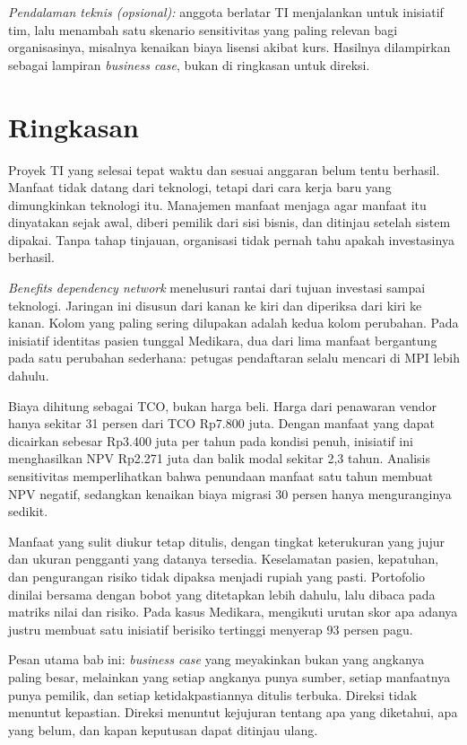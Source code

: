 \textit{Pendalaman teknis (opsional):} anggota berlatar TI menjalankan
 untuk inisiatif tim,
lalu menambah satu skenario sensitivitas yang paling relevan bagi
organisasinya, misalnya kenaikan biaya lisensi akibat kurs. Hasilnya
dilampirkan sebagai lampiran \textit{business case}, bukan di ringkasan untuk
direksi.

\section{Ringkasan}

Proyek TI yang selesai tepat waktu dan sesuai anggaran belum tentu berhasil.
Manfaat tidak datang dari teknologi, tetapi dari cara kerja baru yang
dimungkinkan teknologi itu. Manajemen manfaat menjaga agar manfaat itu
dinyatakan sejak awal, diberi pemilik dari sisi bisnis, dan ditinjau setelah
sistem dipakai. Tanpa tahap tinjauan, organisasi tidak pernah tahu apakah
investasinya berhasil.

\textit{Benefits dependency network} menelusuri rantai dari tujuan investasi
sampai teknologi. Jaringan ini disusun dari kanan ke kiri dan diperiksa dari
kiri ke kanan. Kolom yang paling sering dilupakan adalah kedua kolom
perubahan. Pada inisiatif identitas pasien tunggal Medikara, dua dari lima
manfaat bergantung pada satu perubahan sederhana: petugas pendaftaran selalu
mencari di MPI lebih dahulu.

Biaya dihitung sebagai TCO, bukan harga beli. Harga dari penawaran vendor
hanya sekitar 31 persen dari TCO Rp7.800 juta. Dengan manfaat yang dapat
dicairkan sebesar Rp3.400 juta per tahun pada kondisi penuh, inisiatif ini
menghasilkan NPV Rp2.271 juta dan balik modal sekitar 2,3 tahun. Analisis
sensitivitas memperlihatkan bahwa penundaan manfaat satu tahun membuat NPV
negatif, sedangkan kenaikan biaya migrasi 30 persen hanya menguranginya
sedikit.

Manfaat yang sulit diukur tetap ditulis, dengan tingkat keterukuran yang
jujur dan ukuran pengganti yang datanya tersedia. Keselamatan pasien,
kepatuhan, dan pengurangan risiko tidak dipaksa menjadi rupiah yang pasti.
Portofolio dinilai bersama dengan bobot yang ditetapkan lebih dahulu, lalu
dibaca pada matriks nilai dan risiko. Pada kasus Medikara, mengikuti urutan
skor apa adanya justru membuat satu inisiatif berisiko tertinggi menyerap 93
persen pagu.

Pesan utama bab ini: \textit{business case} yang meyakinkan bukan yang
angkanya paling besar, melainkan yang setiap angkanya punya sumber, setiap
manfaatnya punya pemilik, dan setiap ketidakpastiannya ditulis terbuka.
Direksi tidak menuntut kepastian. Direksi menuntut kejujuran tentang apa yang
diketahui, apa yang belum, dan kapan keputusan dapat ditinjau ulang.

